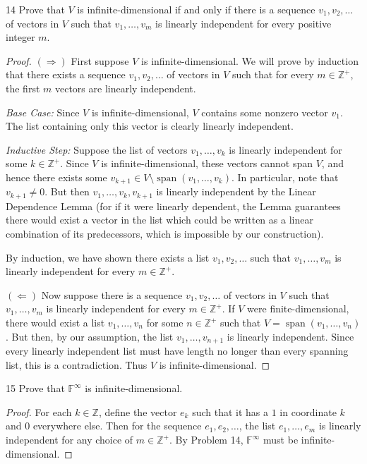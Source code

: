 \documentclass{extarticle}
\newenvironment{problem}[1]{\begin{prob*}{#1}{}}{\end{prob*}}
\newcommand{\Z}{\mathbb{Z}}
\newcommand{\F}{\mathbb{F}}
\DeclareMathOperator{\Span}{span}
\begin{document}
\begin{problem}{14}
Prove that $V$ is infinite-dimensional if and only if there is a sequence $v_1,v_2,\dots$ of vectors in $V$ such that $v_1,\dots,v_m$ is linearly independent for every positive integer $m$.
\end{problem}
\begin{proof}
$(\Rightarrow)$ First suppose $V$ is infinite-dimensional.  We will prove by induction that there exists a sequence $v_1,v_2,\dots$ of vectors in $V$ such that for every $m\in\Z^+$, the first $m$ vectors are linearly independent.
\par \emph{Base Case:} Since $V$ is infinite-dimensional, $V$ contains some nonzero vector $v_1$.  The list containing only this vector is clearly linearly independent.
\par \emph{Inductive Step:} Suppose the list of vectors $v_1, \dots, v_k$ is linearly independent for some $k\in\Z^+$.  Since $V$ is infinite-dimensional, these vectors cannot span $V$, and hence there exists some $v_{k+1}\in V\setminus \Span(v_1,\dots, v_k)$.  In particular, note that $v_{k+1}\neq 0$.  But then $v_1,\dots, v_k, v_{k+1}$ is linearly independent by the Linear Dependence Lemma (for if it were linearly dependent, the Lemma guarantees there would exist a vector in the list which could be written as a linear combination of its predecessors, which is impossible by our construction).
\par By induction, we have shown there exists a list $v_1,v_2,\dots$ such that $v_1,\dots,v_m$ is linearly independent for every $m\in\Z^+$.
\par $(\Leftarrow)$ Now suppose there is a sequence  $v_1,v_2,\dots$ of vectors in $V$ such that $v_1,\dots,v_m$ is linearly independent for every $m\in\Z^+$.  If $V$ were finite-dimensional, there would exist a list $v_1,\dots, v_n$ for some $n\in\Z^+$ such that $V=\Span(v_1,\dots,v_n)$.  But then, by our assumption, the list $v_1,\dots,v_{n+1}$ is linearly independent.  Since every linearly independent list must have length no longer than every spanning list, this is a contradiction.  Thus $V$ is infinite-dimensional.
\end{proof}

\begin{problem}{15}
Prove that $\F^\infty$ is infinite-dimensional.
\end{problem}
\begin{proof}
For each $k\in\Z$, define the vector $e_k$ such that it has a $1$ in coordinate $k$ and $0$ everywhere else.  Then for the sequence $e_1,e_2,\dots$, the list $e_1,\dots, e_m$ is linearly independent for any choice of $m\in\Z^+$.  By Problem 14, $\F^\infty$ must be infinite-dimensional.
\end{proof}
\end{document}
